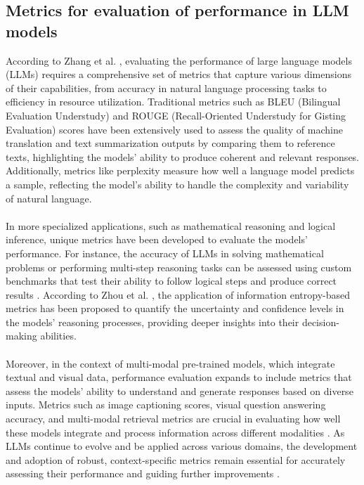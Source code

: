 \subsection*{Metrics for evaluation of performance in LLM models}
According to Zhang et al. \cite{zhang2022opt}, evaluating the performance of large language models (LLMs) requires a comprehensive set of metrics that capture various dimensions of their capabilities, from accuracy in natural language processing tasks to efficiency in resource utilization. Traditional metrics such as BLEU (Bilingual Evaluation Understudy) and ROUGE (Recall-Oriented Understudy for Gisting Evaluation) scores have been extensively used to assess the quality of machine translation and text summarization outputs by comparing them to reference texts, highlighting the models' ability to produce coherent and relevant responses. Additionally, metrics like perplexity measure how well a language model predicts a sample, reflecting the model's ability to handle the complexity and variability of natural language.
\\\\
In more specialized applications, such as mathematical reasoning and logical inference, unique metrics have been developed to evaluate the models' performance. For instance, the accuracy of LLMs in solving mathematical problems or performing multi-step reasoning tasks can be assessed using custom benchmarks that test their ability to follow logical steps and produce correct results \cite{yuan2023scaling} \cite{creswell2022selectioninference}. According to Zhou et al. \cite{zhou-etal-2023-inform}, the application of information entropy-based metrics has been proposed to quantify the uncertainty and confidence levels in the models' reasoning processes, providing deeper insights into their decision-making abilities.
\\\\
Moreover, in the context of multi-modal pre-trained models, which integrate textual and visual data, performance evaluation expands to include metrics that assess the models' ability to understand and generate responses based on diverse inputs. Metrics such as image captioning scores, visual question answering accuracy, and multi-modal retrieval metrics are crucial in evaluating how well these models integrate and process information across different modalities \cite{wang2024largescale}. As LLMs continue to evolve and be applied across various domains, the development and adoption of robust, context-specific metrics remain essential for accurately assessing their performance and guiding further improvements \cite{minaee2024large}.